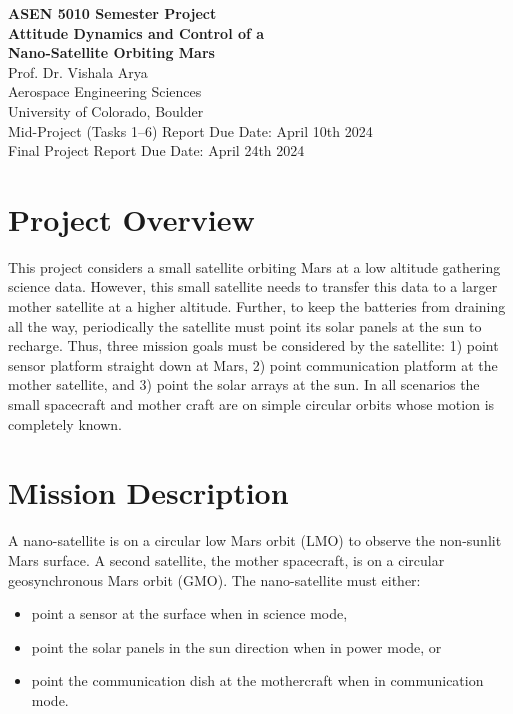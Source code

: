 \documentclass[12pt]{article}
\begin{document}
\begin{titlepage}
    \centering
    \vspace*{2cm}
    {\Huge \textbf{ASEN 5010 Semester Project}}\\[1.5cm]
    {\Large \textbf{Attitude Dynamics and Control of a}}\\[0.5cm]
    {\Large \textbf{Nano-Satellite Orbiting Mars}}\\[2cm]
    {\normalsize Prof. Dr. Vishala Arya}\\
    {\normalsize Aerospace Engineering Sciences}\\
    {\normalsize University of Colorado, Boulder}\\[2cm]
    {\large Mid-Project (Tasks 1--6) Report Due Date: April 10th 2024}\\
    {\large Final Project Report Due Date: April 24th 2024}
    \vfill
\end{titlepage}

\tableofcontents
\newpage

\section{Project Overview}
This project considers a small satellite orbiting Mars at a low altitude gathering science data. However,
this small satellite needs to transfer this data to a larger mother satellite at a higher altitude. Further, to
keep the batteries from draining all the way, periodically the satellite must point its solar panels at the
sun to recharge. Thus, three mission goals must be considered by the satellite: 1) point sensor platform
straight down at Mars, 2) point communication platform at the mother satellite, and 3) point the solar
arrays at the sun. In all scenarios the small spacecraft and mother craft are on simple circular orbits
whose motion is completely known.

\section{Mission Description}
A nano-satellite is on a circular low Mars orbit (LMO) to observe the non-sunlit Mars surface. A second satellite, the mother spacecraft, is on a circular geosynchronous Mars orbit (GMO). The nano-satellite must either:
\begin{itemize}
  \item point a sensor at the surface when in science mode,
  \item point the solar panels in the sun direction when in power mode, or
  \item point the communication dish at the mothercraft when in communication mode.
\end{itemize}
\end{document}
